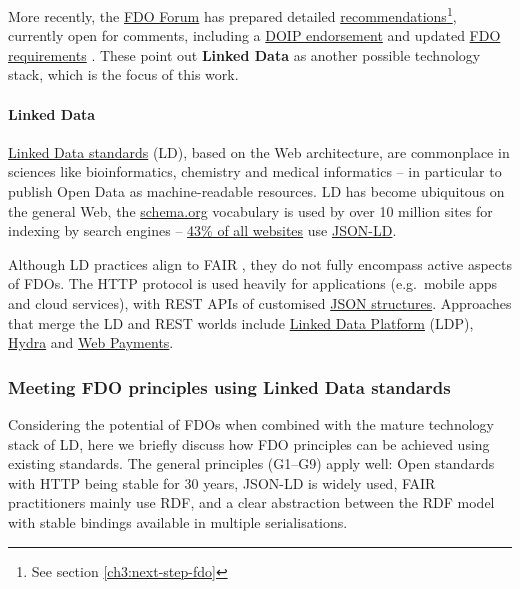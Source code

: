 More recently, the \href{https://fairdo.org/}{FDO Forum} has prepared
detailed
\href{https://drive.google.com/drive/u/0/folders/1-SbZk7enOqjy2Rf57PMB-CQW7qMOUXgO}{recommendations}\footnote{See section \vref{ch3:next-step-fdo}},
currently open for comments, including a
\href{https://docs.google.com/document/d/10ESWe-m0ex7fIW0ZYOYeVg6gAcIaBKyO3W-Vg8tXzdw/edit\#}{DOIP
endorsement} \cite{fdo-DOIPEndorsement} and updated
\href{https://docs.google.com/document/d/1-4_yGRrIcgdMIwaFvHyUt6lxDdfzGpqLUCEihE0vJ-g/edit\#heading=h.gjdgxs}{FDO
requirements} \cite{fdo-RequirementSpec}. These point out \textbf{Linked Data} as another possible
technology stack, which is the focus of this work.

\paragraph{Linked Data}
\label{ch2:linked-data}

\href{https://www.w3.org/standards/semanticweb/data}{Linked Data
standards} (LD), based on the Web architecture, are commonplace in
sciences like bioinformatics, chemistry and medical informatics -- in
particular to publish Open Data as machine-readable resources. LD has
become ubiquitous on the general Web, the
\href{https://schema.org/}{schema.org} vocabulary is used by over 10
million sites for indexing by search engines --
\href{https://w3techs.com/technologies/details/da-jsonld}{43\% of all
websites} use \href{https://json-ld.org/}{JSON-LD}.

Although LD practices align to FAIR \cite{Hasnain 2018},
they do not fully encompass active aspects of FDOs. The HTTP protocol is
used heavily for applications (e.g.~mobile apps and cloud services),
with REST APIs of customised \href{https://json-schema.org/}{JSON
structures}. Approaches that merge the LD and REST worlds include
\href{https://www.w3.org/TR/ldp/}{Linked Data Platform} (LDP),
\href{https://www.hydra-cg.com/}{Hydra} and
\href{https://www.w3.org/TR/webpayments-http-messages/}{Web Payments}.


\subsubsection{Meeting FDO principles using Linked Data
standards}\label{ch2:meeting-fdo-principles-using-linked-data-standards}

Considering the potential of FDOs when combined with the mature
technology stack of LD, here we briefly discuss how FDO principles can
be achieved using existing standards. The general principles (G1--G9)
apply well: Open standards with HTTP being stable for 30 years, JSON-LD
is widely used, FAIR practitioners mainly use RDF, and a clear
abstraction between the RDF model with stable bindings available in
multiple serialisations.

